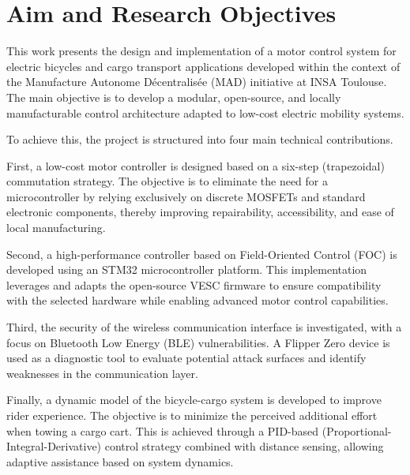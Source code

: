 \section{Aim and Research Objectives}
This work presents the design and implementation of a motor control system for electric bicycles and cargo transport applications developed within the context of the Manufacture Autonome Décentralisée (MAD) initiative at INSA Toulouse. The main objective is to develop a modular, open-source, and locally manufacturable control architecture adapted to low-cost electric mobility systems.

To achieve this, the project is structured into four main technical contributions.

First, a low-cost motor controller is designed based on a six-step (trapezoidal) commutation strategy. The objective is to eliminate the need for a microcontroller by relying exclusively on discrete MOSFETs and standard electronic components, thereby improving repairability, accessibility, and ease of local manufacturing.

Second, a high-performance controller based on Field-Oriented Control (FOC) is developed using an STM32 microcontroller platform. This implementation leverages and adapts the open-source VESC firmware to ensure compatibility with the selected hardware while enabling advanced motor control capabilities.

Third, the security of the wireless communication interface is investigated, with a focus on Bluetooth Low Energy (BLE) vulnerabilities. A Flipper Zero device is used as a diagnostic tool to evaluate potential attack surfaces and identify weaknesses in the communication layer.

Finally, a dynamic model of the bicycle-cargo system is developed to improve rider experience. The objective is to minimize the perceived additional effort when towing a cargo cart. This is achieved through a PID-based (Proportional-Integral-Derivative) control strategy combined with distance sensing, allowing adaptive assistance based on system dynamics.


